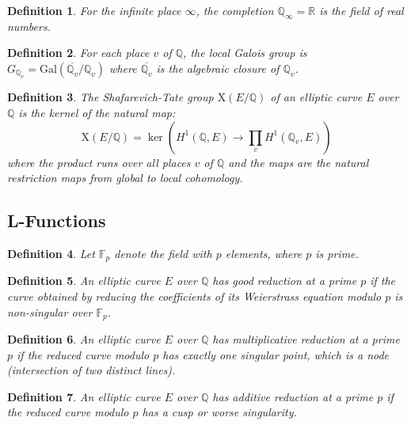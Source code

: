 \documentclass{article}
\newtheorem{definition}{Definition}
\begin{document}
\begin{definition}
  For the infinite place $\infty$, the completion $\mathbb{Q}_{\infty}
  =\mathbb{R}$ is the field of real numbers.
\end{definition}

\begin{definition}
  For each place $v$ of $\mathbb{Q}$, the local Galois group is
  $G_{\mathbb{Q}_v} = \text{Gal} (\overline{\mathbb{Q}_v} /\mathbb{Q}_v)$
  where $\overline{\mathbb{Q}_v}$ is the algebraic closure of $\mathbb{Q}_v$.
\end{definition}

\begin{definition}
  The Shafarevich-Tate group $\mathrm{X} (E /\mathbb{Q})$ of an elliptic curve
  $E$ over $\mathbb{Q}$ is the kernel of the natural map:
  \[ \mathrm{X} (E /\mathbb{Q}) = \ker \left( H^1 (\mathbb{Q}, E) \to \prod_v
     H^1 (\mathbb{Q}_v, E) \right) \]
  where the product runs over all places $v$ of $\mathbb{Q}$ and the maps are
  the natural restriction maps from global to local cohomology.
\end{definition}

\subsection{L-Functions}

\begin{definition}
  Let $\mathbb{F}_p$ denote the field with $p$ elements, where $p$ is prime.
\end{definition}

\begin{definition}
  An elliptic curve $E$ over $\mathbb{Q}$ has good reduction at a prime $p$ if
  the curve obtained by reducing the coefficients of its Weierstrass equation
  modulo $p$ is non-singular over $\mathbb{F}_p$.
\end{definition}

\begin{definition}
  An elliptic curve $E$ over $\mathbb{Q}$ has multiplicative reduction at a
  prime $p$ if the reduced curve modulo $p$ has exactly one singular point,
  which is a node (intersection of two distinct lines).
\end{definition}

\begin{definition}
  An elliptic curve $E$ over $\mathbb{Q}$ has additive reduction at a prime
  $p$ if the reduced curve modulo $p$ has a cusp or worse singularity.
\end{definition}
\end{document}
